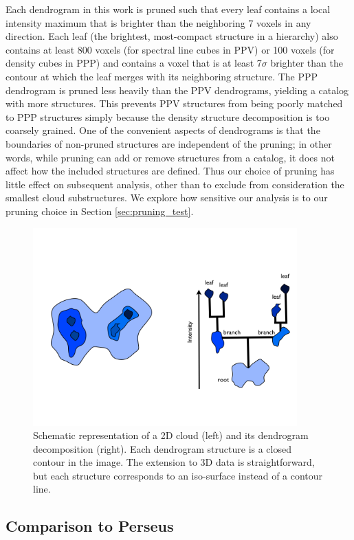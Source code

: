 Each dendrogram in this work is pruned such that every leaf contains a local intensity maximum that is brighter than the neighboring 7 voxels in any direction.
Each leaf (the brightest, most-compact structure in a hierarchy) also contains at least 800 voxels (for spectral line cubes in PPV) or 100 voxels (for density cubes in PPP) and contains a voxel that is at least 7$\sigma$ brighter than the contour at which the leaf merges with its neighboring structure. The PPP dendrogram is pruned less heavily than the PPV dendrograms, yielding a catalog with more structures. This prevents PPV structures from being poorly matched to PPP structures simply because the density structure decomposition is too coarsely grained. One of the convenient aspects of dendrograms is that the boundaries of non-pruned structures are independent of the pruning; in other words, while pruning can add or remove structures from a catalog, it does not affect how the included structures are defined. Thus our choice of pruning has little effect on subsequent analysis, other than to exclude from consideration the smallest cloud substructures. We explore how sensitive our analysis is to our pruning choice in Section \ref{sec:pruning_test}.

\begin{figure}[htbp]
\centering
\includegraphics[width=4in]{figures/dendro_cartoon}
\caption{Schematic representation of a 2D cloud (left) and its dendrogram decomposition (right). Each dendrogram structure is a closed contour in the image. The extension to 3D data is straightforward, but each structure corresponds to an iso-surface instead of a contour line.}
\label{fig:dendro_schematic}
\end{figure}

\subsection{Comparison to Perseus}
\label{sec:perseus}

